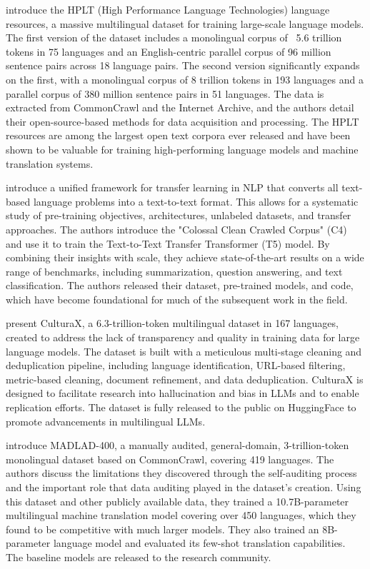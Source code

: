 \documentclass[acmsmall]{acmart}
\begin{document}
\citep{degibert2024newmassivemultilingualdataset} \citep{burchell2025expandedmassivemultilingualdataset}introduce the HPLT (High Performance Language Technologies) language resources, a massive multilingual dataset for training large-scale language models. The first version of the dataset includes a monolingual corpus of ~5.6 trillion tokens in 75 languages and an English-centric parallel corpus of 96 million sentence pairs across 18 language pairs. The second version significantly expands on the first, with a monolingual corpus of 8 trillion tokens in 193 languages and a parallel corpus of 380 million sentence pairs in 51 languages. The data is extracted from CommonCrawl and the Internet Archive, and the authors detail their open-source-based methods for data acquisition and processing. The HPLT resources are among the largest open text corpora ever released and have been shown to be valuable for training high-performing language models and machine translation systems.

\citep{raffel2023exploringlimitstransferlearning} introduce a unified framework for transfer learning in NLP that converts all text-based language problems into a text-to-text format. This allows for a systematic study of pre-training objectives, architectures, unlabeled datasets, and transfer approaches. The authors introduce the "Colossal Clean Crawled Corpus" (C4) and use it to train the Text-to-Text Transfer Transformer (T5) model. By combining their insights with scale, they achieve state-of-the-art results on a wide range of benchmarks, including summarization, question answering, and text classification. The authors released their dataset, pre-trained models, and code, which have become foundational for much of the subsequent work in the field.

 \citep{nguyen2023culturaxcleanedenormousmultilingual} present CulturaX, a 6.3-trillion-token multilingual dataset in 167 languages, created to address the lack of transparency and quality in training data for large language models. The dataset is built with a meticulous multi-stage cleaning and deduplication pipeline, including language identification, URL-based filtering, metric-based cleaning, document refinement, and data deduplication. CulturaX is designed to facilitate research into hallucination and bias in LLMs and to enable replication efforts. The dataset is fully released to the public on HuggingFace to promote advancements in multilingual LLMs.

 \citep{kudugunta2023madlad400multilingualdocumentlevellarge} introduce MADLAD-400, a manually audited, general-domain, 3-trillion-token monolingual dataset based on CommonCrawl, covering 419 languages. The authors discuss the limitations they discovered through the self-auditing process and the important role that data auditing played in the dataset's creation. Using this dataset and other publicly available data, they trained a 10.7B-parameter multilingual machine translation model covering over 450 languages, which they found to be competitive with much larger models. They also trained an 8B-parameter language model and evaluated its few-shot translation capabilities. The baseline models are released to the research community.
\end{document}
